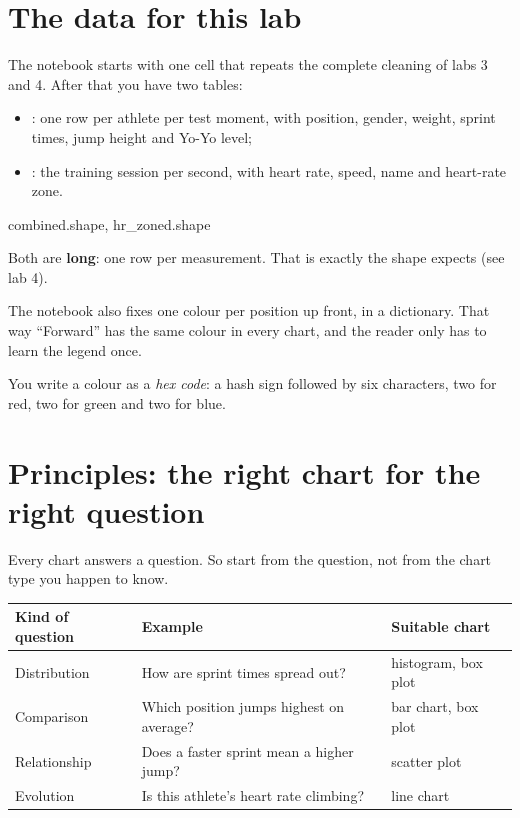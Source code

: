 \documentclass[11pt,a4paper]{article}
\begin{document}
\section{The data for this lab}

The notebook starts with one cell that repeats the complete cleaning of
labs 3 and 4. After that you have two tables:

\begin{itemize}
  \item {}: one row per athlete per test moment, with
        position, gender, weight, sprint times, jump height and Yo-Yo
        level;
  \item {}: the training session per second, with heart
        rate, speed, name and heart-rate zone.
\end{itemize}

\begin{python}
combined.shape, hr_zoned.shape
\end{python}

Both are \textbf{long}: one row per measurement. That is exactly the
shape  expects (see lab 4).

The notebook also fixes one colour per position up front, in a
dictionary. That way ``Forward'' has the same colour in every chart, and
the reader only has to learn the legend once.


You write a colour as a \emph{hex code}: a hash sign followed by six
characters, two for red, two for green and two for blue.

\section{Principles: the right chart for the right question}

Every chart answers a question. So start from the question, not from the
chart type you happen to know.

\begin{center}
\begin{tabularx}{\textwidth}{@{}L{2.8cm}Y L{3.3cm}@{}}
\toprule
\textbf{Kind of question} & \textbf{Example} & \textbf{Suitable chart} \\
\midrule
Distribution & How are sprint times spread out? & histogram, box plot \\
Comparison & Which position jumps highest on average? & bar chart, box plot \\
Relationship & Does a faster sprint mean a higher jump? & scatter plot \\
Evolution & Is this athlete's heart rate climbing? & line chart \\
\bottomrule
\end{tabularx}
\end{center}
\end{document}
